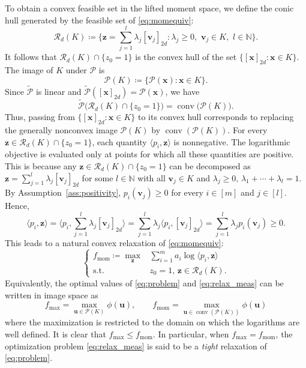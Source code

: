 \documentclass[pdflatex,sn-mathphys-num]{sn-jnl}%
\newcommand{\N}{\mathbb{N}}
\newcommand{\rd}[1]{{\color{red}#1}}
\newcommand{\vect}[1]{\boldsymbol{#1}}
\newcommand{\st}{\mathrm{s.t.}}
\theoremstyle{thmstyleone}%
\theoremstyle{thmstyletwo}%
\theoremstyle{thmstylethree}%
\begin{document}
To obtain a convex feasible set in the lifted moment space, we
define the conic hull generated by the feasible set of
\eqref{eq:momequiv}:
\begin{equation}  \label{Rd(K)}
	\mathscr{R}_d(K) \coloneqq \Big\{ \vect{z} = \sum\limits_{j=1}^l \lambda_j [\vect{v}_j]_{2d} :
	\lambda_j \ge  0, \,\, \vect{v}_j \in K,\,\, l \in \mathbb{N} \Big\}.
\end{equation}
It follows that $\mathscr{R}_d(K)\cap \{z_0=1\}$ is the convex hull 
of the set $\{[\vect{x}]_{2d}: \vect{x}\in K\}$.
{\color{red}
The image of $K$ under $\mathcal{P}$ is
\[
\mathcal{P}(K) \coloneqq
\{\mathcal{P}(\vect{x}):\vect{x}\in K\}.
\]
Since $\widetilde{\mathcal{P}}$ is linear and $\widetilde{\mathcal{P}}([\vect{x}]_{2d})=\mathcal{P}(\vect{x})$, we have
\[
\widetilde{\mathcal{P}}
\big(\mathscr{R}_d(K)\cap\{z_0=1\}\big)
= \operatorname{conv}\big(\mathcal{P}(K)\big).
\]
Thus, passing from $\{[\vect{x}]_{2d}:\vect{x}\in K\}$ to its convex hull corresponds to replacing the generally nonconvex image $\mathcal{P}(K)$ by $\operatorname{conv}(\mathcal{P}(K))$.
}
\rd{For every $\vect{z}\in\mathscr{R}_d(K)\cap\{z_0=1\}$, each quantity $\langle p_i,\vect{z}\rangle$ is nonnegative. 
The logarithmic objective is evaluated only at points for which all these quantities are positive.}
This is because any $\vect{z}\in \mathscr{R}_d(K)\cap \{z_0=1\}$ 
can be decomposed as $\vect{z} = \sum_{j=1}^l \lambda_j[\vect{v}_j]_{2d}$ 
for some $l\in \N$ with all $\vect{v}_j\in K$ and 
$\lambda_j\ge 0,\,\lambda_1+\cdots+\lambda_l=1$.
\rd{By Assumption~\ref{ass:positivity},
$p_i(\vect{v}_j)\geq0$ for every $i\in[m]$ and $j\in[l]$.} Hence,
\[
\langle p_i, \vect{z}\rangle 
= \Big\langle p_i,\sum\limits_{j=1}^l \lambda_j[\vect{v}_j]_{2d}\Big\rangle 
=  \sum\limits_{j=1}^l \lambda_j \langle p_i, [\vect{v}_j]_{2d}\rangle 
= \sum\limits_{j=1}^{l} \lambda_j p_i(\vect{v}_j) \ge 0.
\]
This leads to a natural convex relaxation of \eqref{eq:momequiv}:
\begin{equation}  \label{eq:relax_meas}
	\left\{\begin{array}{rl}
		f_{\operatorname{mom}} \coloneqq \max\limits_{\vect{z}} 
		&  \sum\limits_{i=1}^m a_i \log \langle p_i,\vect{z}\rangle   \\
		\st & z_0 = 1,\, \vect{z}  \in  \mathscr{R}_d(K) .
	\end{array}\right.
\end{equation}
Equivalently, the optimal values of \eqref{eq:problem} and
\eqref{eq:relax_meas} can be written in image space as
\begin{equation}\label{eq:image_formulations}
f_{\max}
=\max_{\vect{u}\in\mathcal{P}(K)}\phi(\vect{u}),
\qquad
f_{\operatorname{mom}}
=\max_{\vect{u}\in\operatorname{conv}(\mathcal{P}(K))}\phi(\vect{u})
\end{equation}
where the maximization is restricted to the domain on which the
logarithms are well defined.
It is clear that $f_{\max}\le f_{\operatorname{mom}}$.
In particular, when $f_{\max}=f_{\operatorname{mom}}$,
the optimization problem \eqref{eq:relax_meas} is said to
be a {\it tight} relaxation of \eqref{eq:problem}.
\end{document}
